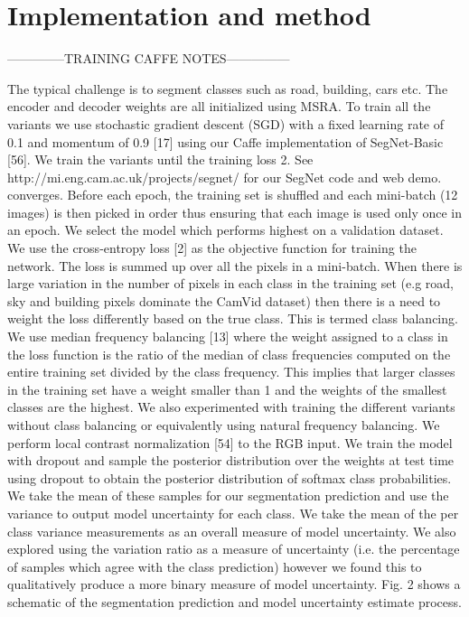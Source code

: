 \chapter{Implementation and method}

--------------TRAINING CAFFE NOTES---------------

The typical challenge is to segment classes such as road, building, cars etc. The encoder and decoder weights are all initialized using MSRA. To train all the variants we use stochastic gradient descent (SGD) with a fixed learning rate of 0.1 and momentum of 0.9 [17] using our Caffe implementation of SegNet-Basic [56]. We train the variants until the training loss
2. See http://mi.eng.cam.ac.uk/projects/segnet/ for our SegNet code and web demo.
converges. Before each epoch, the training set is shuffled and each mini-batch (12 images) is then picked in order thus ensuring that each image is used only once in an epoch. We select the model
which performs highest on a validation dataset. We use the cross-entropy loss [2] as the objective function for training the network. The loss is summed up over all the pixels in a mini-batch. When there is large variation in the number of pixels in each class in the training set (e.g road, sky and building
pixels dominate the CamVid dataset) then there is a need to weight the loss differently based on the true class. This is termed class balancing. We use median frequency balancing [13] where the
weight assigned to a class in the loss function is the ratio of the median of class frequencies computed on the entire training set divided by the class frequency. This implies that larger classes in
the training set have a weight smaller than 1 and the weights of the smallest classes are the highest. We also experimented with training the different variants without class balancing or
equivalently using natural frequency balancing.
We perform local contrast normalization [54] to the RGB input. 
We train the model with dropout and sample the posterior distribution over the weights at test time using dropout
to obtain the posterior distribution of softmax class probabilities. We take the mean of these samples for our segmentation prediction and use the variance to output model
uncertainty for each class. We take the mean of the per class
variance measurements as an overall measure of model uncertainty. We also explored using the variation ratio as
a measure of uncertainty (i.e. the percentage of samples
which agree with the class prediction) however we found
this to qualitatively produce a more binary measure of
model uncertainty. Fig. 2 shows a schematic of the segmentation prediction and model uncertainty estimate process.